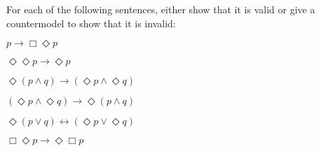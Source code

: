\begin{exercise}
  For each of the following sentences, either show that it is valid or
  give a countermodel to show that it is invalid:
  \begin{exlist}
  \item $p \to \Box\Diamond p$
  \item $\Diamond\Diamond p \to \Diamond p$
  \item $\Diamond(p \land q) \to (\Diamond p \land \Diamond q)$
  \item $(\Diamond p \land \Diamond q) \to \Diamond(p \land q)$
  \item $\Diamond(p \lor q) \leftrightarrow (\Diamond p \lor \Diamond q)$
  \item $\Box\Diamond p \to \Diamond\Box p$
  \end{exlist}
\end{exercise}
